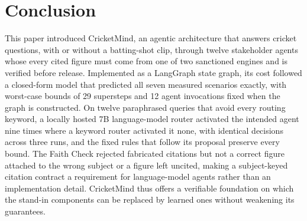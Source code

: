\section{Conclusion}
\label{sec:conclusion}

This paper introduced CricketMind, an agentic architecture that answers cricket
questions, with or without a batting-shot clip, through twelve stakeholder
agents whose every cited figure must come from one of two sanctioned engines
and is verified before release. Implemented as a LangGraph state graph, its
cost followed a closed-form model that predicted all seven measured scenarios
exactly, with worst-case bounds of 29 supersteps and 12 agent invocations fixed
when the graph is constructed. On twelve paraphrased queries that avoid every
routing keyword, a locally hosted 7B language-model router activated the
intended agent nine times where a keyword router activated it none, with
identical decisions across three runs, and the fixed rules that follow its
proposal preserve every bound. The Faith Check rejected fabricated citations
but not a correct figure attached to the wrong subject or a figure left
uncited, making a subject-keyed citation contract a requirement for
language-model agents rather than an implementation detail. CricketMind thus
offers a verifiable foundation on which the stand-in components can be
replaced by learned ones without weakening its guarantees.
